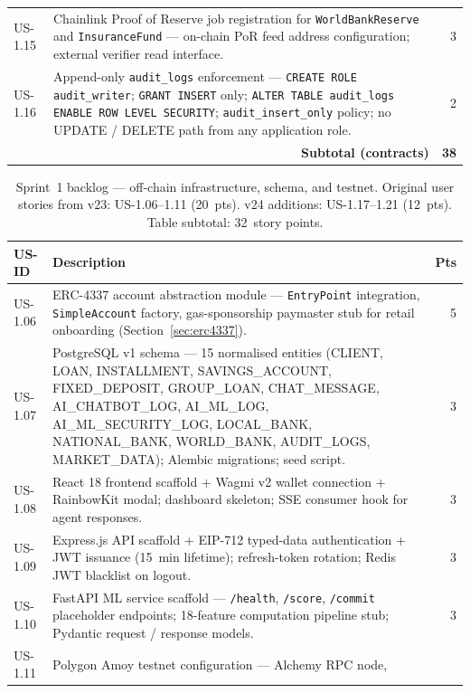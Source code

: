 \begin{table}[H]
\begin{tabular}{p{1.3cm}p{10.2cm}r}
US-1.15 & Chainlink Proof of Reserve job registration for
  \texttt{WorldBankReserve} and \texttt{InsuranceFund} --- on-chain PoR
  feed address configuration; external verifier read interface. & 3 \\
US-1.16 & Append-only \texttt{audit\_logs} enforcement --- \texttt{CREATE ROLE
  audit\_writer}; \texttt{GRANT INSERT} only; \texttt{ALTER TABLE
  audit\_logs ENABLE ROW LEVEL SECURITY}; \texttt{audit\_insert\_only}
  policy; no UPDATE / DELETE path from any application role. & 2 \\
\hline
\multicolumn{2}{r}{\textbf{Subtotal (contracts)}} & \textbf{38} \\
\hline
\end{tabular}
\end{table}

\begin{table}[H]
\centering
\caption{Sprint~1 backlog --- off-chain infrastructure, schema, and testnet.
Original user stories from v23: US-1.06--1.11 (20~pts). v24 additions:
US-1.17--1.21 (12~pts). Table subtotal: 32~story points.}
\label{tab:sprint1-frontend}
\small
\begin{tabular}{p{1.3cm}p{10.2cm}r}
\hline
\textbf{US-ID} & \textbf{Description} & \textbf{Pts} \\
\hline
US-1.06 & ERC-4337 account abstraction module --- \texttt{EntryPoint}
  integration, \texttt{SimpleAccount} factory, gas-sponsorship paymaster
  stub for retail onboarding (Section~\ref{sec:erc4337}). & 5 \\
US-1.07 & PostgreSQL v1 schema --- 15 normalised entities (CLIENT, LOAN,
  INSTALLMENT, SAVINGS\_ACCOUNT, FIXED\_DEPOSIT, GROUP\_LOAN,
  CHAT\_MESSAGE, AI\_CHATBOT\_LOG, AI\_ML\_LOG, AI\_ML\_SECURITY\_LOG,
  LOCAL\_BANK, NATIONAL\_BANK, WORLD\_BANK, AUDIT\_LOGS, MARKET\_DATA);
  Alembic migrations; seed script. & 3 \\
US-1.08 & React 18 frontend scaffold + Wagmi v2 wallet connection +
  RainbowKit modal; dashboard skeleton; SSE consumer hook for agent
  responses. & 3 \\
US-1.09 & Express.js API scaffold + EIP-712 typed-data authentication +
  JWT issuance (15~min lifetime); refresh-token rotation; Redis JWT
  blacklist on logout. & 3 \\
US-1.10 & FastAPI ML service scaffold --- \texttt{/health}, \texttt{/score},
  \texttt{/commit} placeholder endpoints; 18-feature computation pipeline
  stub; Pydantic request / response models. & 3 \\
US-1.11 & Polygon Amoy testnet configuration --- Alchemy RPC node,

\end{tabular}
\end{table}
